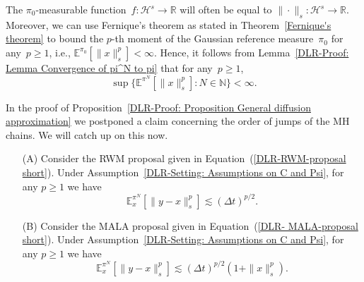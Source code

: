 \begin{rem}
  \label{DLR: Remark Fernique's theorem}
  The $\pi_0$-measurable function~$f:\mathcal{H}^s \to \mathbb{R}$ will often be equal to $\| \cdot \|_s :\mathcal{H}^s \to \mathbb{R}$. Moreover, we can use Fernique's theorem as stated in Theorem~\ref{Fernique's theorem} to bound the $p$-th moment of the Gaussian reference measure~$\pi_0$ for any~$p \geq 1$, i.e., $\mathbb{E}^{\pi_0}[\|x\|_s^p] < \infty$. Hence, it follows from Lemma~\ref{DLR-Proof: Lemma Convergence of pi^N to pi} that for any~$p \geq 1$, 
  \begin{equation*}
    \sup \{ \mathbb{E}^{\pi^N} [\|x\|_s^p] : N \in \mathbb{N}\} < \infty.
  \end{equation*}

\end{rem}


In the proof of Proposition~\ref{DLR-Proof: Proposition General diffusion approximation} we postponed a claim concerning the order of jumps of the MH chains. We will catch up on this now.

\begin{lemma}\autocite[Lemma 4.2]{Pillai2012}
  \label{DLR: Lemma jump size of order(sqrt(Delta t))}
  \begin{enumerate}
    \item[(A)] Consider the RWM proposal given in Equation~(\ref{DLR-RWM-proposal short}). Under Assumption~\ref{DLR-Setting: Assumptions on C and Psi}, for any $p \geq 1$ we have
    \begin{equation*}
      \mathbb{E}^{\pi^N}_x [ \| y -x \|_s^p ] \lesssim (\Delta t)^{p/2}.
    \end{equation*}

    \item[(B)] Consider the MALA proposal given in Equation~(\ref{DLR- MALA-proposal short}). Under Assumption~\ref{DLR-Setting: Assumptions on C and Psi}, for any $p \geq 1$ we have
    \begin{equation*}
      \mathbb{E}^{\pi^N}_x [ \| y -x \|_s^p ] \lesssim (\Delta t)^{p/2} (1 + \| x \|_s^p).
    \end{equation*}
  \end{enumerate}

\end{lemma}

